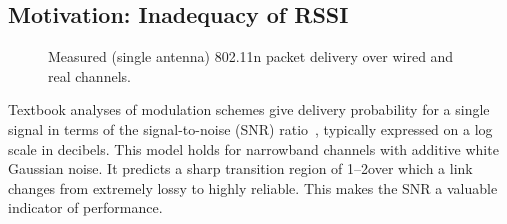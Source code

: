 \subsection{Motivation: Inadequacy of RSSI}
\begin{figure}[t!]
	\centering
%
%
	\caption{\label{fig:rssi_predictions}Measured (single antenna) 802.11n packet delivery over wired and real channels.}%
\end{figure}
Textbook analyses of modulation schemes give delivery probability for a single signal in terms of the signal-to-noise (SNR) ratio~\cite{Goldsmith}, %
typically expressed on a log scale in decibels.
This model holds for narrowband channels with additive white Gaussian noise. It predicts a sharp transition region of 1--2\dB over which a link changes from extremely lossy to highly reliable. This makes the SNR a valuable indicator of performance.

